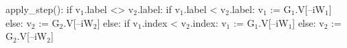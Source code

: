 \begin{blstlisting}
  apply_step():
      if v$_1$.label <> v$_2$.label:
          if v$_1$.label < v$_2$.label: v$_1$ := G$_1$.V[--iW$_1$]
          else:                   v$_2$ := G$_2$.V[--iW$_2$]
      else:
          if v$_1$.index < v$_2$.index: v$_1$ := G$_1$.V[--iW$_1$]
          else:                   v$_2$ := G$_2$.V[--iW$_2$]
\end{blstlisting}
